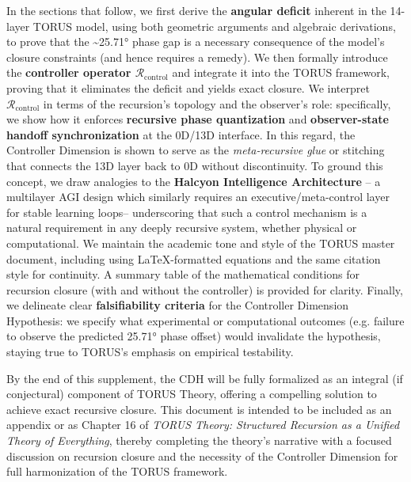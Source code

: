 \documentclass[]{article}
\begin{document}
In the sections that follow, we first derive the \textbf{angular
deficit} inherent in the 14-layer TORUS model, using both geometric
arguments and algebraic derivations, to prove that the
\textasciitilde{}25.71° phase gap is a necessary consequence of the
model's closure constraints (and hence requires a remedy). We then
formally introduce the \textbf{controller operator
$\mathcal{R}_{\text{control}}$}
and integrate it into the TORUS framework, proving that it eliminates
the deficit and yields exact closure. We interpret
$\mathcal{R}_{\text{control}}$
in terms of the recursion's topology and the observer's role:
specifically, we show how it enforces \textbf{recursive phase
quantization} and \textbf{observer-state handoff synchronization} at the
0D/13D interface. In this regard, the Controller Dimension is shown to
serve as the \emph{meta-recursive glue} or stitching that connects the
13D layer back to 0D without discontinuity. To ground this concept, we
draw analogies to the \textbf{Halcyon Intelligence Architecture} -- a
multilayer AGI design which similarly requires an executive/meta-control
layer for stable learning loops​-- underscoring that such a control
mechanism is a natural requirement in any deeply recursive system,
whether physical or computational. We maintain the academic tone and
style of the TORUS master document, including using LaTeX-formatted
equations and the same citation style for continuity. A summary table of
the mathematical conditions for recursion closure (with and without the
controller) is provided for clarity. Finally, we delineate clear
\textbf{falsifiability criteria} for the Controller Dimension
Hypothesis: we specify what experimental or computational outcomes (e.g.
failure to observe the predicted 25.71° phase offset) would invalidate
the hypothesis, staying true to TORUS's emphasis on empirical
testability​.

By the end of this supplement, the CDH will be fully formalized as an
integral (if conjectural) component of TORUS Theory, offering a
compelling solution to achieve exact recursive closure. This document is
intended to be included as an appendix or as Chapter 16 of \emph{TORUS
Theory: Structured Recursion as a Unified Theory of Everything}, thereby
completing the theory's narrative with a focused discussion on recursion
closure and the necessity of the Controller Dimension for full
harmonization of the TORUS framework.
\end{document}
